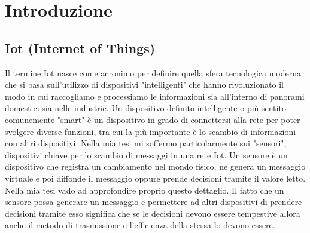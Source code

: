 \documentclass[12pt,a4paper,openright,twoside]{report}
\begin{document}
	\begin{abstract}	
		\setcounter{page}{9}
		\thispagestyle{plain}
		TODO
		IoT (Internet of Things) è l'acronimo utilizzato per indicare la sfera tecnologica che ha alla base l'utilizzo di oggetti intelligenti. 
		Per oggetti intelligenti si intendono quei dispositivi, macchine o attrezzature che si possono connettere a internet per trasmettere, ricevere dati o elaborarli.
		All'interno di questa sfera, uno dei metodi di comunicazione più utilizzati è quello basato su un modello Publish/Subscribe che consente lo scambio di dati tra dispositivi della rete senza la necessità di connessioni dirette tra loro.
		Per funzionare si utilizza il protocollo MQTT, uno dei protocolli più diffusi per lo scambio di messaggi, il quale si basa su una struttura con 3 tipologie di dispositivi connessi: Publisher, Subscriber e Broker.
		I Publisher una volta ottenuti dei dati tramite sensori di vario genere, li pubblica, rendendoli disponibili nella rete. I dati per spostarsi all'interno della rete utilizzano i broker cioè vari punti/server di connessione, i quali permettono il passaggio di dati per poi infine arrivare ai Subscribers per la lettura e l'elaborazione.
		Questa tesi riprende il lavoro effettuato da un collega nell'anno 21-22 approfondendo e sviluppando i casi di test con particolare attenzione a quelle che sono le caratteristiche che 
		possono portare criticità al calcolo della soluzione ottima di percorso per il flusso dei dati.
		La tesi del collega si basa sull'idea di costruire un sistema distribuito sfruttando le proprietà matematiche del rilassamento Lagrangiano, dove ogni nodo conosce solamente i propri vicini.
	\end{abstract}
	
	\chapter{Introduzione}             
	\section{Iot (Internet of Things)}              
	Il termine Iot nasce come acronimo per definire quella sfera tecnologica moderna che si basa sull'utilizzo di dispositivi "intelligenti" che hanno rivoluzionato il modo in cui raccogliamo e processiamo le informazioni sia all'interno di panorami domestici sia nelle industrie.
	Un dispositivo definito intelligente o più sentito comunemente "smart" è un dispositivo in grado di connettersi alla rete per poter svolgere diverse funzioni, tra cui la più importante è lo scambio di informazioni con altri dispositivi.
	Nella mia tesi mi soffermo particolarmente sui "sensori", dispositivi chiave per lo scambio di messaggi in una rete Iot.
	Un sensore è un dispositivo che registra un cambiamento nel mondo fisico, ne genera un messaggio virtuale e poi diffonde il messaggio oppure prende decisioni tramite il valore letto.
	Nella mia tesi vado ad approfondire proprio questo dettaglio.
	Il fatto che un sensore possa generare un messaggio e permettere ad altri dispositivi di prendere decisioni tramite esso significa che se le decisioni devono essere tempestive allora anche il metodo di trasmissione e l'efficienza della stessa lo devono essere.
\end{document}
